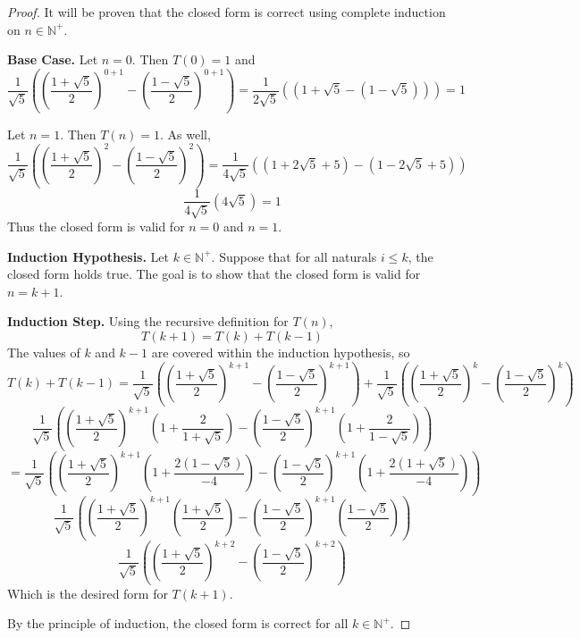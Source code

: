 \documentclass[11pt]{article}
\begin{document}
\begin{enumerate}[label=(\alph*)]
        \begin{proof}
            It will be proven that the closed form is correct using complete induction on \(n \in \mathbb{N}^+\).

            \textbf{Base Case.} Let \(n=0\). Then \(T(0) = 1\) and
            \[
                \frac{1}{\sqrt{5}}\left(\left(\frac{1+\sqrt{5}}{2}\right)^{0+1} - \left(\frac{1-\sqrt{5}}{2}\right)^{0+1}\right) = \frac{1}{2\sqrt{5}}\left((1+\sqrt{5} - (1-\sqrt{5})) \right) = 1
            \]
            
            Let \(n=1\). Then \(T(n) = 1\). As well,
            \[
                \frac{1}{\sqrt{5}}\left(\left(\frac{1+\sqrt{5}}{2}\right)^{2} - \left(\frac{1-\sqrt{5}}{2}\right)^{2}\right) = \frac{1}{4\sqrt{5}}((1+2\sqrt{5} +5) - (1-2\sqrt{5} +5))
            \]
            \[
                \frac{1}{4\sqrt{5}}(4\sqrt{5}) = 1
            \]
            Thus the closed form is valid for \(n=0\) and \(n=1\).

            \textbf{Induction Hypothesis.} Let \(k \in \mathbb{N}^+\). Suppose that for all naturals \(i \leq k\), the closed form holds true. The goal is to show that the closed form is valid for \(n=k+1\).

            \textbf{Induction Step.} Using the recursive definition for \(T(n)\),
            \[
                T(k+1) = T(k) + T(k-1)
            \]
            The values of \(k\) and \(k-1\) are covered within the induction hypothesis, so
            \[
                T(k) + T(k-1) = \frac{1}{\sqrt{5}}\left(\left(\frac{1+\sqrt{5}}{2}\right)^{k+1} - \left(\frac{1-\sqrt{5}}{2}\right)^{k+1}\right) + \frac{1}{\sqrt{5}}\left(\left(\frac{1+\sqrt{5}}{2}\right)^{k} - \left(\frac{1-\sqrt{5}}{2}\right)^{k}\right)
            \]
            \[
                \frac{1}{\sqrt{5}}\left( \left(\frac{1+\sqrt{5}}{2}\right)^{k+1} \left( 1 + \frac{2}{1+\sqrt{5}}\right) - \left(\frac{1-\sqrt{5}}{2}\right)^{k+1} \left(1 + \frac{2}{1-\sqrt{5}} \right) \right)
            \]
            \[
                = \frac{1}{\sqrt{5}}\left( \left( \frac{1+\sqrt{5}}{2} \right)^{k+1} \left( 1 + \frac{2(1-\sqrt{5})}{-4} \right) - \left( \frac{1-\sqrt{5}}{2} \right)^{k+1} \left( 1 + \frac{2(1+\sqrt{5})}{-4}\right) \right)
            \]
            \[
                \frac{1}{\sqrt{5}}\left( \left( \frac{1+\sqrt{5}}{2} \right)^{k+1} \left(\frac{1+\sqrt{5}}{2} \right) - \left(\frac{1-\sqrt{5}}{2} \right)^{k+1} \left(\frac{1-\sqrt{5}}{2}\right)\right)
            \]
            \[
                \frac{1}{\sqrt{5}}\left( \left( \frac{1+\sqrt{5}}{2} \right)^{k+2} - \left(\frac{1-\sqrt{5}}{2} \right)^{k+2}\right)
            \]
            Which is the desired form for \(T(k+1)\).

            By the principle of induction, the closed form is correct for all \(k \in \mathbb{N}^+\).

        \end{proof}
    \end{enumerate}
\end{document}
